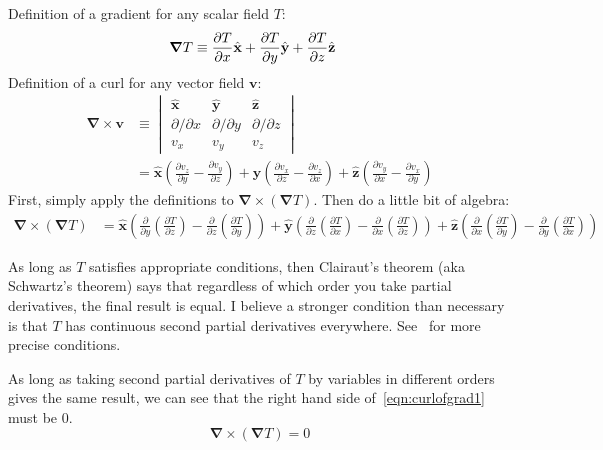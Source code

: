 \documentclass[a4paper]{article}
\theoremstyle{plain}
\theoremstyle{definition}
\newcommand{\vect}[1]{\textbf{#1}}
\newcommand{\hatvec}[1]{\hat{\textbf{#1}}}
\newcommand{\del}{\bm{\nabla}}
\begin{document}
Definition of a gradient for any scalar field $T$:
\begin{align*}
  \grad T & \equiv \frac{\partial T}{\partial x} \hatvec{x}
                 + \frac{\partial T}{\partial y} \hatvec{y}
                 + \frac{\partial T}{\partial z} \hatvec{z}
\end{align*}
Definition of a curl for any vector field $\vect{v}$:
\begin{align*}
  \del \times \vect{v} &
      \equiv \begin{vmatrix}
                 \hatvec{x} & \hatvec{y} & \hatvec{z} \\
                 \partial / \partial x & \partial / \partial y & \partial / \partial z \\
                 v_x & v_y & v_z
             \end{vmatrix} \\
      & =   \hatvec{x} ( \frac{\partial v_z}{\partial y} - \frac{\partial v_y}{\partial z} )
          + \hatvec{y} ( \frac{\partial v_x}{\partial z} - \frac{\partial v_z}{\partial x} )
          + \hatvec{z} ( \frac{\partial v_y}{\partial x} - \frac{\partial v_x}{\partial y} )
\end{align*}
First, simply apply the definitions to $\del \times (\del T)$.  Then
do a little bit of algebra:
\begin{align}
\del \times (\del T) &
  = \hatvec{x} ( \frac{\partial}{\partial y} ( \frac{\partial T}{\partial z} ) - \frac{\partial}{\partial z} ( \frac{\partial T}{\partial y} ) )
  + \hatvec{y} ( \frac{\partial}{\partial z} ( \frac{\partial T}{\partial x} ) - \frac{\partial}{\partial x} ( \frac{\partial T}{\partial z} ) )
  + \hatvec{z} ( \frac{\partial}{\partial x} ( \frac{\partial T}{\partial y} ) - \frac{\partial}{\partial y} ( \frac{\partial T}{\partial x} ) )
  \label{eqn:curlofgrad1}
\end{align}

As long as $T$ satisfies appropriate conditions, then Clairaut's
theorem (aka Schwartz's theorem) says that regardless of which order
you take partial derivatives, the final result is equal.  I believe a
stronger condition than necessary is that $T$ has continuous second
partial derivatives everywhere.
See~\cite{SymmetryOfSecondDerivatives} for more precise conditions.

As long as taking second partial derivatives of $T$ by variables in
different orders gives the same result, we can see that the right hand
side of~\eqref{eqn:curlofgrad1} must be 0.
\begin{equation}
\del \times (\del T) = 0
\end{equation}
\end{document}
